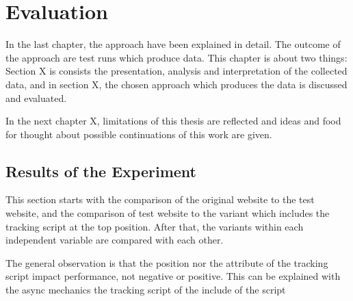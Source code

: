 \chapter{Evaluation}


In the last chapter, the approach have been explained in detail.
The outcome of the approach are test runs which produce data.
This chapter is about two things:
Section X is consists the presentation, analysis and interpretation of the collected data, and in section X, the chosen approach which produces the data is discussed and evaluated.


In the next chapter X, limitations of this thesis are reflected and ideas and food for thought about possible continuations of this work are given.






\section{Results of the Experiment}

This section starts with the comparison of the original website to the test website, and the comparison of test website to the variant which includes the tracking script at the top position.
After that, the variants within each independent variable are compared with each other.


The general observation is that the position nor the attribute of the tracking script impact performance, not negative or positive.
This can be explained with the async mechanics the tracking script of the include of the script




